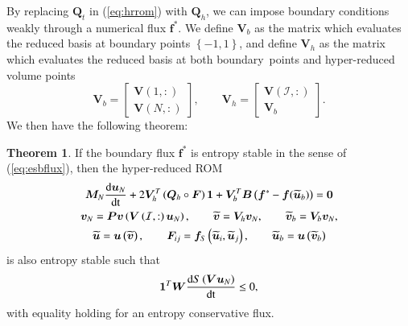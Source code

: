 \documentclass[preprint,10pt]{elsarticle}
\theoremstyle{definition}
\theoremstyle{lemma}
\theoremstyle{theorem}
\newtheorem{theorem}{Theorem}
\theoremstyle{assumption}
\renewcommand{\tilde}{\widetilde}
\newcommand{\td}[2]{\frac{{\rm d}#1}{{\rm d}{\rm #2}}}
\newcommand{\LRp}[1]{\left( #1 \right)}
\newcommand{\LRc}[1]{\left\{ #1 \right\}}
\begin{document}
By replacing $\bm{Q}_t$ in (\ref{eq:hrrom}) with $\bm{Q}_h$, we can impose boundary conditions weakly through a numerical flux $\bm{f}^*$.  We define $\bm{V}_b$ as the matrix which evaluates the reduced basis at boundary points $\LRc{-1,1}$, and define $\bm{V}_h$ as the matrix which evaluates the reduced basis at both boundary points and hyper-reduced volume points
\[
\bm{V}_{b} = \begin{bmatrix}\bm{V}(1,:) \\ \bm{V}(N,:)\end{bmatrix}, \qquad \bm{V}_h = \begin{bmatrix}
\bm{V}\LRp{\mathcal{I},:}\\
\bm{V}_{b}
\end{bmatrix}.
\]
We then have the following theorem:
\begin{theorem}
If the boundary flux $\bm{f}^*$ is entropy stable in the sense of (\ref{eq:esbflux}), then the hyper-reduced ROM 
\begin{gather}
\bm{M}_N\td{\bm{u}_N}{t} + 2\bm{V}_h^T\LRp{\bm{Q}_h \circ \bm{F}}\bm{1} + \bm{V}_{b}^T\bm{B}\LRp{\bm{f}^* - \bm{f}(\tilde{\bm{u}}_b)} = \bm{0} \label{eq:esbchr}\\
\bm{v}_N = \bm{P}\bm{v}\LRp{\bm{V}\LRp{\mathcal{I},:}\bm{u}_N}, \qquad \tilde{\bm{v}} = 
\bm{V}_h
\bm{v}_N, \qquad \tilde{\bm{v}}_b = \bm{V}_b\bm{v}_N, \nonumber\\
\tilde{\bm{u}} = \bm{u}\LRp{\tilde{\bm{v}}}, \qquad \bm{F}_{ij} = \bm{f}_S\LRp{\tilde{\bm{u}}_i,\tilde{\bm{u}}_j}, \qquad  \tilde{\bm{u}}_b = \bm{u}\LRp{\tilde{\bm{v}}_b}\nonumber
\end{gather}
is also entropy stable such that
\[
\bm{1}^T\bm{W}\td{S\LRp{\bm{V}\bm{u}_N}}{t} \leq 0,
\]
with equality holding for an entropy conservative flux.
\label{thm:esbchr}
\end{theorem}
\end{document}
